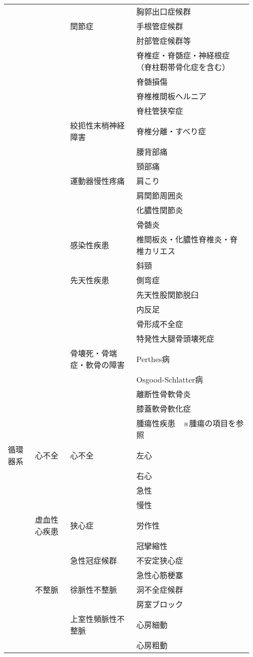 \begin{xltabular}{\linewidth}{XXXX}
 &  &  & 胸郭出口症候群 \\
 &  & 関節症 & 手根管症候群 \\
 &  &  & 肘部管症候群等 \\
 &  &  & 脊椎症・脊髄症・神経根症（脊柱靭帯骨化症を含む） \\
 &  &  & 脊髄損傷 \\
 &  &  & 脊椎椎間板ヘルニア \\
 &  &  & 脊柱管狭窄症 \\
 &  & 絞扼性末梢神経障害 & 脊椎分離・すべり症 \\
 &  &  & 腰背部痛 \\
 &  &  & 頸部痛 \\
 &  & 運動器慢性疼痛 & 肩こり \\
 &  &  & 肩関節周囲炎 \\
 &  &  & 化膿性関節炎 \\
 &  &  & 骨髄炎 \\
 &  & 感染性疾患 & 椎間板炎・化膿性脊椎炎・脊椎カリエス \\
 &  &  & 斜頸 \\
 &  & 先天性疾患 & 側弯症 \\
 &  &  & 先天性股関節脱臼 \\
 &  &  & 内反足 \\
 &  &  & 骨形成不全症 \\
 &  &  & 特発性大腿骨頭壊死症 \\
 &  & 骨壊死・骨端症・軟骨の障害 & Perthes病 \\
 &  &  & Osgood-Schlatter病 \\
 &  &  & 離断性骨軟骨炎 \\
 &  &  & 膝蓋軟骨軟化症 \\
 &  &  & 腫瘍性疾患　※腫瘍の項目を参照 \\
循環器系 & 心不全 & 心不全 & 左心 \\
 &  &  & 右心 \\
 &  &  & 急性 \\
 &  &  & 慢性 \\
 & 虚血性心疾患 & 狭心症 & 労作性 \\
 &  &  & 冠攣縮性 \\
 &  & 急性冠症候群 & 不安定狭心症 \\
 &  &  & 急性心筋梗塞 \\
 & 不整脈 & 徐脈性不整脈 & 洞不全症候群 \\
 &  &  & 房室ブロック \\
 &  & 上室性頻脈性不整脈 & 心房細動 \\
 &  &  & 心房粗動 \\

\end{xltabular}

